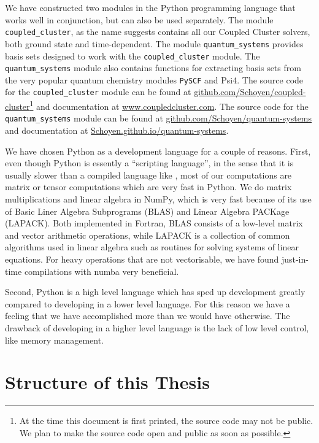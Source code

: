     We have constructed two modules in the Python programming language that works
    well in conjunction, but 
    can also be used separately. The module \lstinline{coupled_cluster}, as the  
    name suggests contains all our Coupled Cluster solvers, both ground state and 
    time-dependent. The module \lstinline{quantum_systems} provides basis sets
    designed to work with the \lstinline{coupled_cluster} module. The 
    \lstinline{quantum_systems} module also contains functions for extracting basis sets 
    from the very popular quantum chemistry modules \lstinline{PySCF}\cite{PYSCF}
    and Psi4\cite{parrish2017psi4}. The source code for the \lstinline{coupled_cluster} module 
    can be found at
    \url{github.com/Schoyen/coupled-cluster}\footnote{At the time this document is 
    first printed, the source code may not be public. We plan to make the source code 
    open and public as soon as possible.} and documentation at 
    \url{www.coupledcluster.com}.
    The source code for the \lstinline{quantum_systems} module 
    can be found at
    \url{github.com/Schoyen/quantum-systems} and documentation at 
    \url{Schoyen.github.io/quantum-systems}.

    We have chosen Python as a development language for a couple of reasons. 
    First, even though Python is essently a  ``scripting language'', in the sense 
    that it is usually slower than a compiled language like \CC,
    most of our computations are matrix or tensor computations which are very fast
    in Python. We do matrix multiplications and linear algebra in NumPy, which 
    is very fast because of its use of Basic Liner Algebra Subprograms (BLAS) 
    and Linear Algebra PACKage (LAPACK).
    Both implemented in Fortran, BLAS consists of a low-level matrix and vector 
    arithmetic operations, while LAPACK is a collection of common algorithms 
    used in linear algebra such as routines for solving systems of linear 
    equations. For heavy operations that are not vectorisable, we have found
    just-in-time compilations with numba very beneficial.

    Second, Python is a high level language which has sped up development greatly 
    compared to developing in a lower level language. For this reason we 
    have a feeling that we have accomplished more than we would have 
    otherwise. The drawback of developing in a higher level language is the 
    lack of low level control, like memory management. 

\section{Structure of this Thesis}

